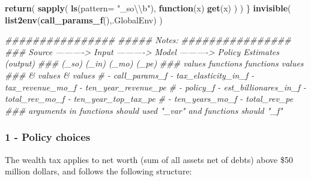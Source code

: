 \documentclass[]{article}
\newenvironment{Shaded}{\begin{snugshade}}{\end{snugshade}}
\newcommand{\CharTok}[1]{\textcolor[rgb]{0.31,0.60,0.02}{#1}}
\newcommand{\CommentTok}[1]{\textcolor[rgb]{0.56,0.35,0.01}{\textit{#1}}}
\newcommand{\ControlFlowTok}[1]{\textcolor[rgb]{0.13,0.29,0.53}{\textbf{#1}}}
\newcommand{\DataTypeTok}[1]{\textcolor[rgb]{0.13,0.29,0.53}{#1}}
\newcommand{\KeywordTok}[1]{\textcolor[rgb]{0.13,0.29,0.53}{\textbf{#1}}}
\newcommand{\NormalTok}[1]{#1}
\newcommand{\StringTok}[1]{\textcolor[rgb]{0.31,0.60,0.02}{#1}}
\begin{document}
\begin{Shaded}
\begin{Highlighting}[]
    \KeywordTok{return}\NormalTok{( }\KeywordTok{sapply}\NormalTok{( }\KeywordTok{ls}\NormalTok{(}\DataTypeTok{pattern=} \StringTok{"_so}\CharTok{\textbackslash{}\textbackslash{}}\StringTok{b"}\NormalTok{), }\ControlFlowTok{function}\NormalTok{(x) }\KeywordTok{get}\NormalTok{(x) ) ) }
\NormalTok{\}}
\KeywordTok{invisible}\NormalTok{( }\KeywordTok{list2env}\NormalTok{(}\KeywordTok{call_params_f}\NormalTok{(),.GlobalEnv) )}


\CommentTok{################ }
\CommentTok{#####  Notes:}
\CommentTok{################ }
\CommentTok{### Source ---------->  Input ---------->  Model ---------->  Policy Estimates (output)}
\CommentTok{###  (_so)              (_in)              (_mo)                (_pe)}
\CommentTok{### values            functions          functions              values}
\CommentTok{###                   & values           & values             }
\CommentTok{# - call_params_f - tax_elasticity_in_f  - tax_revenue_mo_f     - ten_year_revenue_pe}
\CommentTok{# - policy_f      - est_billionares_in_f - total_rev_mo_f       - ten_year_top_tax_pe}
\CommentTok{#                                        - ten_years_mo_f       - total_rev_pe}
\CommentTok{### arguments in functions should used "_var" and functions should "_f"}
\end{Highlighting}
\end{Shaded}

\hypertarget{policy-choices}{%
\subsubsection{1 - Policy choices}\label{policy-choices}}

The wealth tax applies to net worth (sum of all assets net of debts)
above \$50 million dollars, and follows the following structure:
\end{document}
